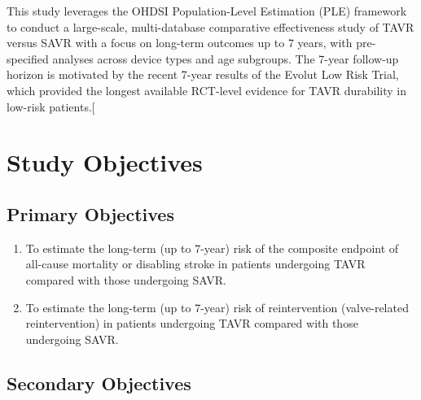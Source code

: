\documentclass[
  12pt,
]{article}
\providecommand{\tightlist}{%
  \setlength{\itemsep}{0pt}\setlength{\parskip}{0pt}}
\begin{document}
This study leverages the OHDSI Population-Level Estimation (PLE)
framework to conduct a large-scale, multi-database comparative
effectiveness study of TAVR versus SAVR with a focus on long-term
outcomes up to 7 years, with pre-specified analyses across device types
and age subgroups. The 7-year follow-up horizon is motivated by the
recent 7-year results of the Evolut Low Risk Trial, which provided the
longest available RCT-level evidence for TAVR durability in low-risk
patients.{[}\citeproc{ref-Forrest2026}{16}{]}

\section{Study Objectives}\label{study-objectives}

\subsection{Primary Objectives}\label{primary-objectives}

\begin{enumerate}
\def\labelenumi{\arabic{enumi}.}
\tightlist
\item
  To estimate the long-term (up to 7-year) risk of the composite
  endpoint of all-cause mortality or disabling stroke in patients
  undergoing TAVR compared with those undergoing SAVR.
\item
  To estimate the long-term (up to 7-year) risk of reintervention
  (valve-related reintervention) in patients undergoing TAVR compared
  with those undergoing SAVR.
\end{enumerate}

\subsection{Secondary Objectives}\label{secondary-objectives}
\end{document}
